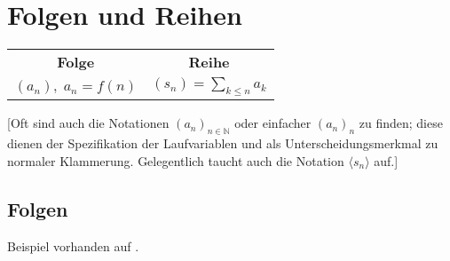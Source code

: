 \chapter{Folgen und Reihen}

\noindent\begin{center}
    \begin{tabular}{cc}
    	   \textbf{Folge}     &        \textbf{Reihe}         \\
    	$(a_n),\; a_n = f(n)$ & $(s_n) = \sum_{k \leq n} a_k$
    \end{tabular}
\end{center}

[Oft sind auch die Notationen $(a_n)_{n \in \mathbb{N}}$ oder einfacher $(a_n)_n$ zu finden; diese dienen der Spezifikation der Laufvariablen und als Unterscheidungsmerkmal zu normaler Klammerung.
Gelegentlich taucht auch die Notation $\langle s_n \rangle$ auf.]

\section{Folgen}

\CheckedBox{} Beispiel vorhanden auf .

